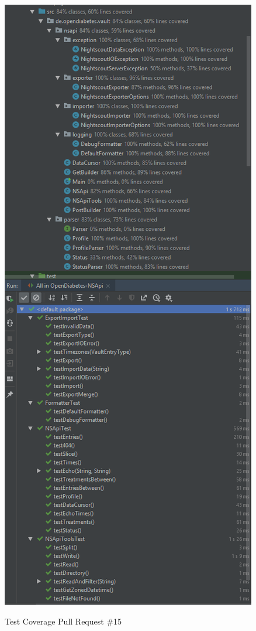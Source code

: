 \documentclass[accentcolor=tud0b,12pt,paper=a4]{tudreport}
\begin{document}
\begin{figure}[h]
\centering
\caption{Test Coverage Pull Request \#15}
\includegraphics[width=\textwidth,height=\textheight,keepaspectratio]{pr-cov-15}
\label{pr-cov:15}
\end{figure}
\end{document}
